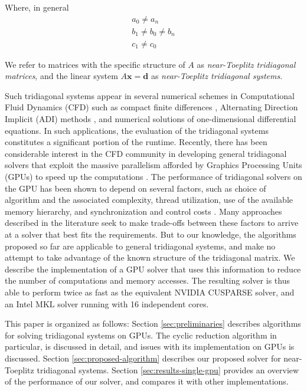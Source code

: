 \documentclass{elsarticle}
\begin{document}
Where, in general
\begin{align*}
    & a_0 \neq a_n & \\
    & b_1 \neq b_0 \neq b_n &\\
    & c_1 \neq c_0 &
\end{align*}

We refer to matrices with the specific structure of $A$
as \emph{near-Toeplitz tridiagonal matrices},
and the linear system $A\bm{x}=\bm{d}$ as \emph{near-Toeplitz tridiagonal systems}.

Such tridiagonal systems
appear in several numerical schemes
in Computational Fluid Dynamics (CFD)
such as
compact finite differences \cite{lele1992compact},
Alternating Direction Implicit (ADI) methods \cite{1955ADI}, and
numerical solutions of one-dimensional differential equations.
In such applications,
the evaluation of the tridiagonal systems constitutes
a significant portion of the runtime.
Recently, there has been considerable interest in the CFD community
in developing general tridiagonal solvers that
exploit the massive parallelism afforded by
Graphics Processing Units (GPUs)
to speed up the computations
\cite{tutkun2012gpu}
\cite{esfahanian2014efficient}
\cite{GoSt11CR}.
The performance of tridiagonal solvers on the GPU
has been shown to depend on several factors,
such as
choice of algorithm and the associated complexity,
thread utilization,
use of the available memory hierarchy,
and synchronization and control costs
\cite{Zhang2010FTS}.
Many approaches described in the literature
seek to make trade-offs between these factors
to arrive at a solver that best fits the requirements.
But to our knowledge,
the algorithms proposed so far
are applicable to general tridiagonal systems,
and make no attempt to take advantage of
the known structure of the tridiagonal matrix.
We describe the implementation of a GPU solver that
uses this information to
reduce the number of computations
and memory accesses.
The resulting solver is thus able to perform twice as fast as
the equivalent NVIDIA CUSPARSE solver,
and an Intel MKL solver running with 16 independent cores.

This paper is organized as follows:
Section \ref{sec:preliminaries}
describes algorithms for solving tridiagonal systems on GPUs.
The cyclic reduction algorithm in particular, is discussed in detail,
and issues with its implementation on GPUs is discussed.
Section \ref{sec:proposed-algorithm}
describes our proposed solver for near-Toeplitz tridiagonal systems.
Section \ref{sec:results-single-gpu}
provides an overview of the performance of our solver,
and compares it with other implementations.
\end{document}
